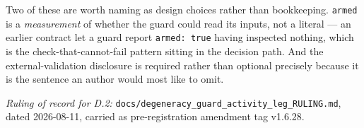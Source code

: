 Two of these are worth naming as design choices rather than bookkeeping. \texttt{armed} is a
\emph{measurement} of whether the guard could read its inputs, not a literal --- an earlier
contract let a guard report \texttt{armed: true} having inspected nothing, which is the
check-that-cannot-fail pattern sitting in the decision path. And the external-validation
disclosure is required rather than optional precisely because it is the sentence an author would
most like to omit.

\medskip
\noindent\emph{Ruling of record for D.2:} \texttt{docs/degeneracy\_guard\_activity\_leg\_RULING.md},
dated 2026-08-11, carried as pre-registration amendment tag v1.6.28.
